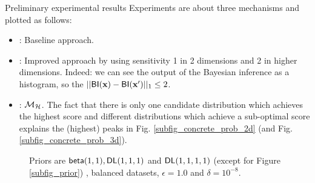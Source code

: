 \documentclass[final,hyperref={pdfpagelabels=false}]{beamer}
\begin{document}
\begin{frame}[t]
\begin{columns}[t]
\begin{column}{.485\textwidth}
  \begin{block}{Preliminary experimental results}
    Experiments are about three mechanisms and plotted as follows:
\begin{itemize}
  \item {\textbf{\color{green}{Green}}}: Baseline approach. %
  \item {\textbf{\color{red}{Red}}}: Improved approach by using sensitivity 1 in 2 dimensions and 2 in higher dimensions.
    Indeed: we can see the output of the Bayesian inference as a histogram, so the $||\mathsf{BI}(\textbf{x})-\mathsf{BI}(\textbf{x}')||_1 \leq 2$.
    
  \item {\textbf{\color{blue}{Blue}}}: $\mathcal{M}_{\mathcal{H}}$. The fact that there is only one candidate distribution which achieves the highest score and different
    distributions which achieve a sub-optimal score explains the (highest) peaks in Fig.  \ref{subfig_concrete_prob_2d} (and Fig. \ref{subfig_concrete_prob_3d}).
\end{itemize}
\begin{figure}[H]
\begin{center}
\centering


  \caption{Priors are $\mathsf{beta}(1,1), \mathsf{DL}(1,1,1)$ and $\mathsf{DL}(1,1,1,1)$ (except for Figure \ref{subfig_prior}) ,
    balanced datasets, $\epsilon = 1.0$ and $\delta = 10^{-8}$. }
\label{fig_sampling}
\end{center}



\end{figure}
\end{block}
\end{column}
\end{columns}
\end{frame}
\end{document}
